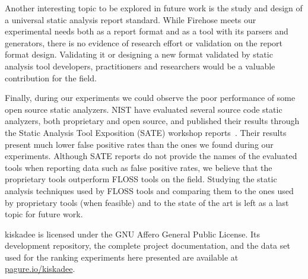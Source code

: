 Another interesting topic to be explored in future work is the study and design
of a universal static analysis report standard. While Firehose meets our
experimental needs both as a report format and as a tool with its parsers and
generators, there is no evidence of research effort or validation on the report
format design. Validating it or designing a new format validated by static
analysis tool developers, practitioners and researchers would be a valuable
contribution for the field.

Finally, during our experiments we could observe the poor performance of some
open source static analyzers. NIST have evaluated several source code static
analyzers, both proprietary and open source, and published their results
through the Static Analysis Tool Exposition (SATE) workshop
reports~\cite{okun2013report}. Their results present much lower false positive
rates than the ones we found during our experiments. Although SATE reports do
not provide the names of the evaluated tools when reporting data such as false
positive rates, we believe that the proprietary tools outperform FLOSS tools on
the field. Studying the static analysis techniques used by FLOSS tools and
comparing them to the ones used by proprietary tools (when feasible) and to the
state of the art is left as a last topic for future work.

kiskadee is licensed under the GNU Affero General Public License. Its
development repository, the complete project documentation, and the data set
used for the ranking experiments here presented are available at
\url{pagure.io/kiskadee}.
